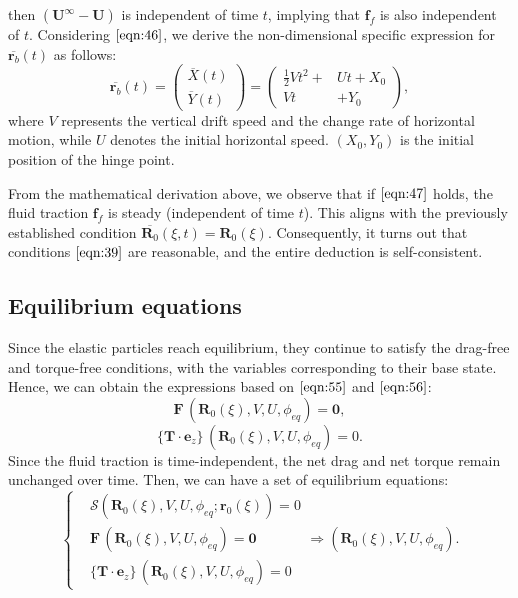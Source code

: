 \documentclass[a4paper,12pt]{report}
\begin{document}
then $(\mathbf{U}^{\infty}-\mathbf{U})$ is independent of time $t$, implying that $\mathbf{f}_{f}$ is also independent of $t$.
Considering $\eqref{eqn:46}$, we derive the non-dimensional specific expression for $\overline{\mathbf{r}_b}(t)$ as follows:
\begin{equation}
	\label{eqn:47}
	\overline{\mathbf{r}_b}(t)=\left(\begin{aligned}
		\overline{X}(t)\\
		\overline{Y}(t)
	\end{aligned}\right)=\left(\begin{aligned}
		\frac{1}{2}V t^2+&Ut+X_0\\
		Vt&+Y_0
	\end{aligned}\right),
\end{equation}
where $V$ represents the vertical drift speed and the change rate  of horizontal motion, while $U$ denotes the initial horizontal speed. $(X_0, Y_0)$ is the initial position of the hinge point.

 From the mathematical derivation above, we observe that if $\eqref{eqn:47}$ holds, the fluid traction $\mathbf{f}_{f}$ is steady (independent of time $t$). This aligns with the previously established condition $\overline{\mathbf{R}_0}(\xi,t)=\mathbf{R}_0(\xi)$. Consequently, it turns out that conditions $\eqref{eqn:39}$ are reasonable, and the entire deduction is self-consistent.

\subsection{Equilibrium equations}
Since the elastic particles reach equilibrium, they continue to satisfy the drag-free and torque-free conditions, with the variables corresponding to their base state. Hence, we can obtain the expressions based on $\eqref{eqn:55}$ and $\eqref{eqn:56}$:
\begin{equation}
	\label{eqn:120}
	\mathbf{F}\,(\mathbf{R}_0(\xi), V, U, \phi_{eq})=\mathbf{0},
\end{equation}
\begin{equation}
	\label{eqn:121}
	\{\mathbf{T}\cdot\mathbf{e}_z\}\,(\mathbf{R}_0(\xi), V, U, \phi_{eq})=0.
\end{equation}
Since the fluid traction is time-independent, the net drag and net torque remain unchanged over time. Then, we can have a set of equilibrium equations:
\begin{equation}
	\label{eqn:122}
	\left\{\begin{aligned}
		&\mathbf{\mathcal{S}}\left(\mathbf{R}_0(\xi), V, U,\phi_{eq};\mathbf{r}_0(\xi)\right)=0\\
		&\mathbf{F}\,(\mathbf{R}_0(\xi), V, U, \phi_{eq})=\mathbf{0}\\
		&\{\mathbf{T}\cdot\mathbf{e}_z\}\,(\mathbf{R}_0(\xi), V, U, \phi_{eq})=0
	\end{aligned}\right.\Longrightarrow \left(\mathbf{R}_0(\xi), V, U, \phi_{eq}\right).
\end{equation}
\end{document}
